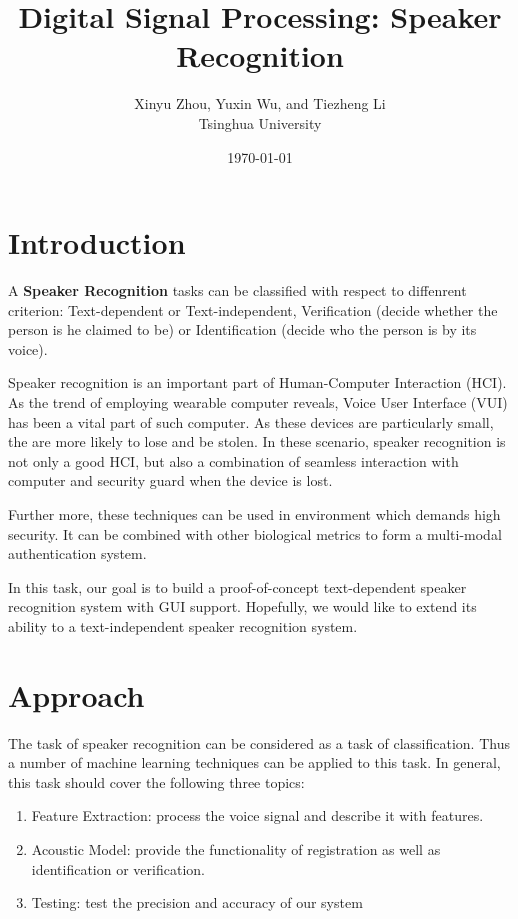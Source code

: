 \documentclass{article}
\title{Digital Signal Processing: Speaker Recognition}
\author{Xinyu Zhou, Yuxin Wu, and Tiezheng Li\\ Tsinghua University}
\date{\today}
\begin{document}
\maketitle
\section{Introduction}
A \textbf{Speaker Recognition} tasks can be classified with respect to diffenrent criterion:
Text-dependent or Text-independent, Verification (decide whether the person is he claimed
to be) or Identification (decide who the person is by its voice).\cite{SRwiki}

Speaker recognition is an important part of Human-Computer Interaction (HCI).
As the trend of employing wearable computer reveals, Voice User Interface (VUI)
has been a vital part of such computer. As these devices are particularly small,
the are more likely to lose and be stolen. In these scenario, speaker recognition
is not only a good HCI, but also a combination of seamless interaction with computer
and security guard when the device is lost.

Further more, these techniques can be used in environment which demands high security.
It can be combined with other biological metrics to form a multi-modal authentication
system.

In this task, our goal is to build a proof-of-concept text-dependent speaker recognition system with GUI support.
Hopefully, we would like to extend its ability to a text-independent speaker recognition system.

\section{Approach}

The task of speaker recognition can be considered as a task of classification. Thus a number of machine learning techniques
can be applied to this task. In general, this task should cover the following three topics:
\begin{enumerate}
  \item Feature Extraction: process the voice signal and describe it with features.

  \item Acoustic Model: provide the functionality of registration as well as identification or verification.

  \item Testing: test the precision and accuracy of our system
\end{enumerate}
\end{document}
